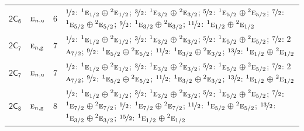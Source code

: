 \documentclass[10pt,a4paper]{article}
\numberwithin{equation}{section}
\newcommand{\grp}[1]{\mathsf{#1}}
\newcommand{\irr}[1]{\text{\normalfont\scshape #1}}
\newcommand{\conjpair}[1]{{}^{#1}}
\newcommand{\ptag}[1]{\mathrm{#1}}
\newlength{\fillwidth}\newlength{\cellwidth}\newlength{\colwidth}
\begin{document}
{\begin{longtable}{@{}llr>{\RaggedRight\arraybackslash}p{\fillwidth}@{}}
\href{2C6.pdf}{$\grp{2C_{6}}$} & $\irr{e}_{n,\ptag{u}}$ & 6 & $\nicefrac{1}{2}$: $\conjpair{1}\irr{e}_{1/2}$${}\oplus{}$$\conjpair{2}\irr{e}_{1/2}$; $\nicefrac{3}{2}$: $\conjpair{1}\irr{e}_{3/2}$${}\oplus{}$$\conjpair{2}\irr{e}_{3/2}$; $\nicefrac{5}{2}$: $\conjpair{1}\irr{e}_{5/2}$${}\oplus{}$$\conjpair{2}\irr{e}_{5/2}$; $\nicefrac{7}{2}$: $\conjpair{1}\irr{e}_{5/2}$${}\oplus{}$$\conjpair{2}\irr{e}_{5/2}$; $\nicefrac{9}{2}$: $\conjpair{1}\irr{e}_{3/2}$${}\oplus{}$$\conjpair{2}\irr{e}_{3/2}$; $\nicefrac{11}{2}$: $\conjpair{1}\irr{e}_{1/2}$${}\oplus{}$$\conjpair{2}\irr{e}_{1/2}$\\
\href{2C7.pdf}{$\grp{2C_{7}}$} & $\irr{e}_{n,\ptag{g}}$ & 7 & $\nicefrac{1}{2}$: $\conjpair{1}\irr{e}_{1/2}$${}\oplus{}$$\conjpair{2}\irr{e}_{1/2}$; $\nicefrac{3}{2}$: $\conjpair{1}\irr{e}_{3/2}$${}\oplus{}$$\conjpair{2}\irr{e}_{3/2}$; $\nicefrac{5}{2}$: $\conjpair{1}\irr{e}_{5/2}$${}\oplus{}$$\conjpair{2}\irr{e}_{5/2}$; $\nicefrac{7}{2}$: 2$\irr{a}_{7/2}$; $\nicefrac{9}{2}$: $\conjpair{1}\irr{e}_{5/2}$${}\oplus{}$$\conjpair{2}\irr{e}_{5/2}$; $\nicefrac{11}{2}$: $\conjpair{1}\irr{e}_{3/2}$${}\oplus{}$$\conjpair{2}\irr{e}_{3/2}$; $\nicefrac{13}{2}$: $\conjpair{1}\irr{e}_{1/2}$${}\oplus{}$$\conjpair{2}\irr{e}_{1/2}$\\
\href{2C7.pdf}{$\grp{2C_{7}}$} & $\irr{e}_{n,\ptag{u}}$ & 7 & $\nicefrac{1}{2}$: $\conjpair{1}\irr{e}_{1/2}$${}\oplus{}$$\conjpair{2}\irr{e}_{1/2}$; $\nicefrac{3}{2}$: $\conjpair{1}\irr{e}_{3/2}$${}\oplus{}$$\conjpair{2}\irr{e}_{3/2}$; $\nicefrac{5}{2}$: $\conjpair{1}\irr{e}_{5/2}$${}\oplus{}$$\conjpair{2}\irr{e}_{5/2}$; $\nicefrac{7}{2}$: 2$\irr{a}_{7/2}$; $\nicefrac{9}{2}$: $\conjpair{1}\irr{e}_{5/2}$${}\oplus{}$$\conjpair{2}\irr{e}_{5/2}$; $\nicefrac{11}{2}$: $\conjpair{1}\irr{e}_{3/2}$${}\oplus{}$$\conjpair{2}\irr{e}_{3/2}$; $\nicefrac{13}{2}$: $\conjpair{1}\irr{e}_{1/2}$${}\oplus{}$$\conjpair{2}\irr{e}_{1/2}$\\
\href{2C8.pdf}{$\grp{2C_{8}}$} & $\irr{e}_{n,\ptag{g}}$ & 8 & $\nicefrac{1}{2}$: $\conjpair{1}\irr{e}_{1/2}$${}\oplus{}$$\conjpair{2}\irr{e}_{1/2}$; $\nicefrac{3}{2}$: $\conjpair{1}\irr{e}_{3/2}$${}\oplus{}$$\conjpair{2}\irr{e}_{3/2}$; $\nicefrac{5}{2}$: $\conjpair{1}\irr{e}_{5/2}$${}\oplus{}$$\conjpair{2}\irr{e}_{5/2}$; $\nicefrac{7}{2}$: $\conjpair{1}\irr{e}_{7/2}$${}\oplus{}$$\conjpair{2}\irr{e}_{7/2}$; $\nicefrac{9}{2}$: $\conjpair{1}\irr{e}_{7/2}$${}\oplus{}$$\conjpair{2}\irr{e}_{7/2}$; $\nicefrac{11}{2}$: $\conjpair{1}\irr{e}_{5/2}$${}\oplus{}$$\conjpair{2}\irr{e}_{5/2}$; $\nicefrac{13}{2}$: $\conjpair{1}\irr{e}_{3/2}$${}\oplus{}$$\conjpair{2}\irr{e}_{3/2}$; $\nicefrac{15}{2}$: $\conjpair{1}\irr{e}_{1/2}$${}\oplus{}$$\conjpair{2}\irr{e}_{1/2}$\\

\end{longtable}}
\end{document}

